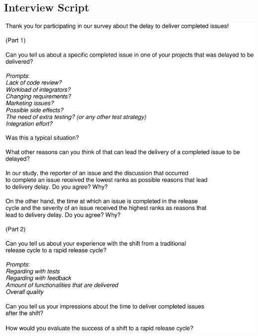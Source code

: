 \documentclass[
	12pt,				%
	openright,			%
	oneside,			%
	a4paper,			%
	french,				%
	spanish,			%
	brazil,				%
	english
	]{abntex2}
\newcounter{pt}
\newcounter{th}
\begin{document}
\begin{apendicesenv}
\chapter{Interview Script}\label{interview_script}

\includegraphics[width=.9\textwidth,keepaspectratio]{chapters/chapter5/appendix/InterviewScript.pdf}

\end{apendicesenv}
%
%
%
%
%
%
%
%
%
%

\printindex
\end{document}
